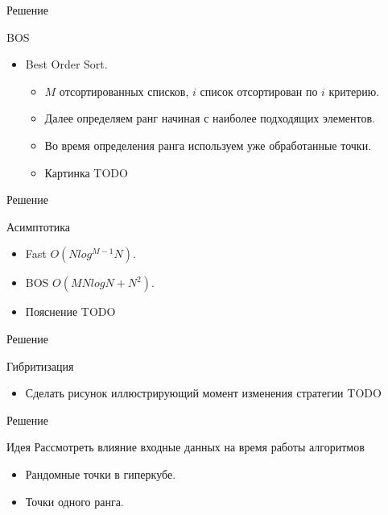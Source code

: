 \documentclass{beamer}
\begin{document}
\begin{frame}{Решение}
\begin{block}{BOS}
\begin{center}
\end{center}
\begin{itemize}
\item Best Order Sort.
\begin{itemize}
\item $M$ отсортированных списков, $i$ список отсортирован по $i$ критерию. 
\item Далее определяем ранг начиная с наиболее подходящих элементов. 
\item Во время определения ранга используем уже обработанные точки.
\item Картинка TODO
\end{itemize}
\end{itemize}
\end{block}
\end{frame}


\begin{frame}{Решение}
\begin{block}{Асимптотика}
\begin{itemize}
\item Fast $O(N log^{M-1}N)$.
\item BOS $O(MNlogN + N^2)$.
\item Пояснение TODO
\end{itemize}
\end{block}
\end{frame}


\begin{frame}{Решение}
\begin{block}{Гибритизация}
\begin{itemize}
\item Сделать рисунок иллюстрирующий момент изменения стратегии TODO
\end{itemize}
\end{block}
\end{frame}


\begin{frame}{Решение}
\begin{block}{Идея}
Рассмотреть влияние входные данных на время работы алгоритмов
\begin{itemize}
\item Рандомные точки в гиперкубе.
\item Точки одного ранга.
\end{itemize}
\end{block}
\end{frame}
\end{document}
